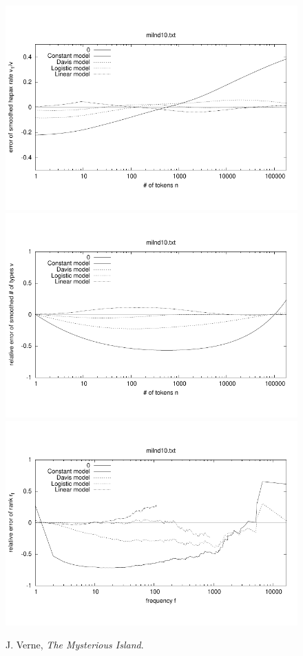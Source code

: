 \documentclass[a4paper,12pt]{article}
\begin{document}
\begin{figure}[p]
  \centering
  \vspace{-2em}
  \includegraphics[width=0.8\columnwidth]{output/herdan/milnd10_27/token_ratio_residual.pdf}
  \\[-3em]
  \includegraphics[width=0.8\columnwidth]{output/herdan/milnd10_27/token_residual.pdf}
  \\[-3em]
  \includegraphics[width=0.8\columnwidth]{output/herdan/milnd10_27/frequency_residual.pdf}
  \vspace{-2em}
  \caption{J. Verne, \emph{The Mysterious Island}.\label{figmilnd10R}}
\end{figure}
\end{document}
